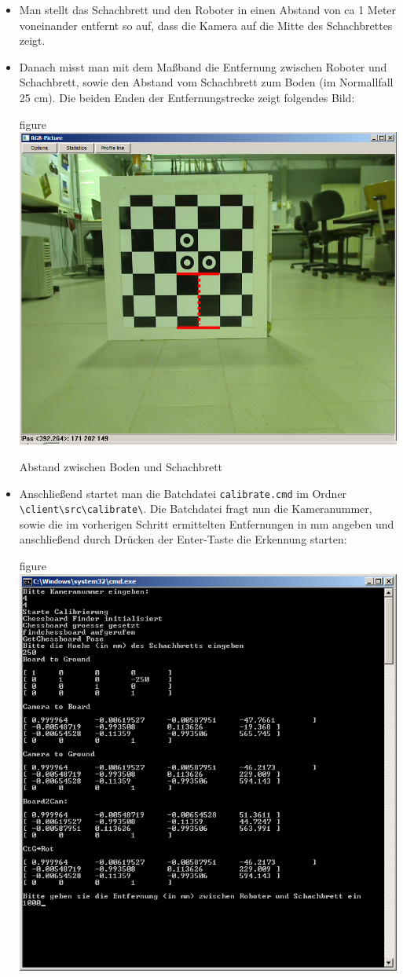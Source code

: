 \begin{itemize}
\item Man stellt das Schachbrett und den Roboter in einen Abstand von
  ca 1 Meter voneinander entfernt so auf, dass die Kamera auf die
  Mitte des Schachbrettes zeigt. 
\item Danach misst man mit dem Maßband die Entfernung zwischen Roboter
  und Schachbrett, sowie den Abstand vom Schachbrett zum Boden (im
  Normallfall 25 cm). Die
  beiden Enden der Entfernungstrecke zeigt folgendes Bild:
 \begin{nofloat}{figure}\centering
    \includegraphics[width=0.55\linewidth]{bilder/camToGround_red}
    \caption{Abstand zwischen Boden und Schachbrett}
  \end{nofloat}
\item Anschließend startet man die Batchdatei \verb|calibrate.cmd| im
  Ordner \verb|\client\src\calibrate\|. Die Batchdatei fragt nun die
  Kameranummer, sowie die im vorherigen Schritt ermittelten 
 Entfernungen in mm angeben und anschließend durch Drücken der
 Enter-Taste die Erkennung starten:
 \begin{nofloat}{figure}\centering
    \includegraphics[width=1\linewidth]{bilder/calibrate1}

\end{nofloat}
\end{itemize}
